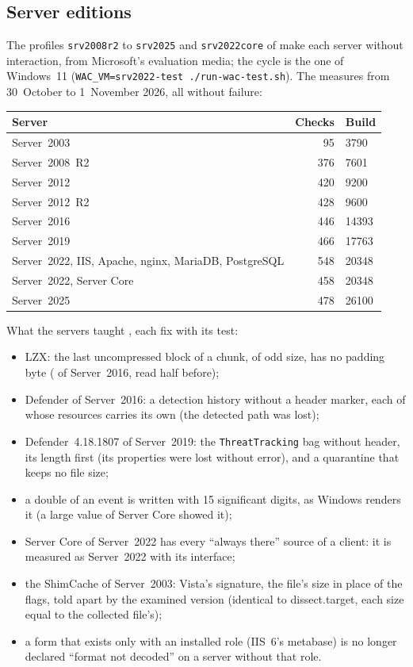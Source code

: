 \documentclass[11pt,a4paper,oneside]{report}
\begin{document}
\subsection*{Server editions}

The profiles \texttt{srv2008r2} to \texttt{srv2025} and \texttt{srv2022core} of
 make each server without interaction, from Microsoft's
evaluation media; the cycle is the one of Windows~11
(\texttt{WAC\_VM=srv2022-test ./run-wac-test.sh}). The measures from 30~October to
1~November 2026, all without failure:

\begin{center}
\begin{tabular}{@{}lrl@{}}
\toprule
Server & Checks & Build \\
\midrule
Server~2003 & 95 & 3790 \\
Server~2008~R2 & 376 & 7601 \\
Server~2012 & 420 & 9200 \\
Server~2012~R2 & 428 & 9600 \\
Server~2016 & 446 & 14393 \\
Server~2019 & 466 & 17763 \\
Server~2022, IIS, Apache, nginx, MariaDB, PostgreSQL & 548 & 20348 \\
Server~2022, Server Core & 458 & 20348 \\
Server~2025 & 478 & 26100 \\
\bottomrule
\end{tabular}
\end{center}

What the servers taught \wac{}, each fix with its test:
\begin{itemize}
  \item LZX: the last uncompressed block of a chunk, of odd size, has no
    padding byte ( of Server~2016, read half before);
  \item Defender of Server~2016: a detection history without a header
    marker, each of whose resources carries its own (the detected path was
    lost);
  \item Defender~4.18.1807 of Server~2019: the \texttt{ThreatTracking} bag
    without header, its length first (its properties were lost without
    error), and a quarantine that keeps no file size;
  \item a double of an event is written with 15 significant digits, as
    Windows renders it (a large value of Server Core showed it);
  \item Server Core of Server~2022 has every ``always there'' source of a
    client: it is measured as Server~2022 with its interface;
  \item the ShimCache of Server~2003: Vista's signature, the file's size in
    place of the flags, told apart by the examined version (identical to
    dissect.target, each size equal to the collected file's);
  \item a form that exists only with an installed role (IIS~6's metabase)
    is no longer declared ``format not decoded'' on a server without that
    role.
\end{itemize}
\end{document}
